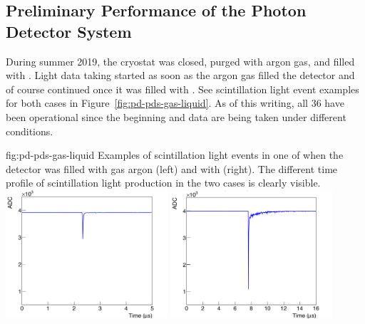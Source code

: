

\subsection{Preliminary Performance of the  Photon Detector System}

During summer 2019, the  cryostat was closed, purged with argon gas, and filled with . Light data taking started %
as soon as the argon gas filled the detector and of course continued once it was filled with  . See scintillation light event examples for both cases in Figure~\ref{fig:pd-pds-gas-liquid}. As of this writing, all 36  have been operational since the beginning and data are being taken under different conditions.

\begin{dunefigure}{fig:pd-pds-gas-liquid} {Examples of scintillation light events in one  of  when the detector was filled with gas argon (left) and with  (right). The different time profile of scintillation light production in the two cases is clearly visible.}
\includegraphics[width=0.45\textwidth]{graphics/dppd_gas.png}
\includegraphics[width=0.45\textwidth]{graphics/dppd_liquid.png}
\end{dunefigure}

